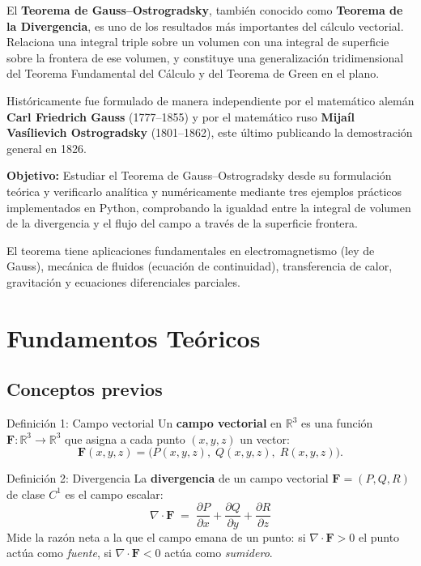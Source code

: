 \documentclass[12pt,a4paper]{article}
\begin{document}
El \textbf{Teorema de Gauss--Ostrogradsky}, también conocido como \textbf{Teorema de la Divergencia}, es uno de los resultados más importantes del cálculo vectorial. Relaciona una integral triple sobre un volumen con una integral de superficie sobre la frontera de ese volumen, y constituye una generalización tridimensional del Teorema Fundamental del Cálculo y del Teorema de Green en el plano.

Históricamente fue formulado de manera independiente por el matemático alemán \textbf{Carl Friedrich Gauss} (1777--1855) y por el matemático ruso \textbf{Mijaíl Vasílievich Ostrogradsky} (1801--1862), este último publicando la demostración general en 1826.

\begin{cajaconcepto}
\textbf{Objetivo:} Estudiar el Teorema de Gauss--Ostrogradsky desde su formulación teórica y verificarlo analítica y numéricamente mediante tres ejemplos prácticos implementados en Python, comprobando la igualdad entre la integral de volumen de la divergencia y el flujo del campo a través de la superficie frontera.
\end{cajaconcepto}

El teorema tiene aplicaciones fundamentales en electromagnetismo (ley de Gauss), mecánica de fluidos (ecuación de continuidad), transferencia de calor, gravitación y ecuaciones diferenciales parciales.

\section{Fundamentos Teóricos}

\subsection{Conceptos previos}

\begin{cajadefinicion}{Definición 1: Campo vectorial}
Un \textbf{campo vectorial} en $\mathbb{R}^3$ es una función $\mathbf{F}:\mathbb{R}^3 \to \mathbb{R}^3$ que asigna a cada punto $(x,y,z)$ un vector:
\[
\mathbf{F}(x,y,z) = \big(P(x,y,z),\; Q(x,y,z),\; R(x,y,z)\big).
\]
\end{cajadefinicion}

\begin{cajadefinicion}{Definición 2: Divergencia}
La \textbf{divergencia} de un campo vectorial $\mathbf{F}=(P,Q,R)$ de clase $C^1$ es el campo escalar:
\[
\nabla \cdot \mathbf{F} \;=\;
\frac{\partial P}{\partial x} +
\frac{\partial Q}{\partial y} +
\frac{\partial R}{\partial z}
\]
Mide la razón neta a la que el campo emana de un punto: si $\nabla\cdot\mathbf{F} > 0$ el punto actúa como \emph{fuente}, si $\nabla\cdot\mathbf{F} < 0$ actúa como \emph{sumidero}.
\end{cajadefinicion}
\end{document}
